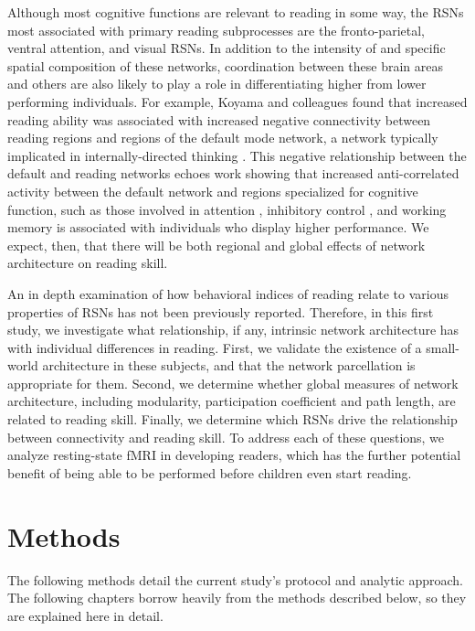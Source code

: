 Although most cognitive functions are relevant to reading in some way, the RSNs most associated with primary reading subprocesses are the fronto-parietal, ventral attention, and visual RSNs.  In addition to the intensity of and specific spatial composition of these networks, coordination between these brain areas and others are also likely to play a role in differentiating higher from lower performing individuals. For example, Koyama and colleagues found that increased reading ability was associated with increased negative connectivity between reading regions and regions of the default mode network, a network typically implicated in internally-directed thinking \citep{Andrews-Hanna2011}. This negative relationship between the default and reading networks echoes work showing that increased anti-correlated activity between the default network and regions specialized for cognitive function, such as those involved in attention \citep{Kelly2008, Mennes2010, Seeley2007}, inhibitory control \citep{Tian2013}, and working memory \citep{Keller2015, Sala-Llonch2011} is associated with individuals who display higher performance. We expect, then, that there will be both regional and global effects of network architecture on reading skill.

An in depth examination of how behavioral indices of reading relate to various properties of RSNs has not been previously reported. Therefore, in this first study, we investigate what relationship, if any, intrinsic network architecture has with individual differences in reading. First, we validate the existence of a small-world architecture in these subjects, and that the network parcellation is appropriate for them. Second, we determine whether global measures of network architecture, including modularity, participation coefficient and path length, are related to reading skill. Finally, we determine which RSNs drive the relationship between connectivity and reading skill. To address each of these questions, we analyze resting-state fMRI in developing readers, which has the further potential benefit of being able to be performed before children even start reading.


\section{Methods}

The following methods detail the current study's protocol and analytic approach. The following chapters borrow heavily from the methods described below, so they are explained here in detail. 

